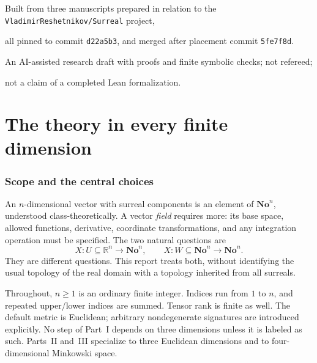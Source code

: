 \documentclass[11pt,letterpaper]{article}
\theoremstyle{definition}
\theoremstyle{remark}
\newcommand{\No}{\mathbf{No}}
\newcommand{\R}{\mathbb R}\newcommand{\C}{\mathbb C}
\newcommand{\repo}{\texttt{VladimirReshetnikov/Surreal}}
\begin{document}
\begin{titlepage}
\begin{minipage}{0.94\textwidth}
\begin{abstract}
Every infinite operation carries an explicit support hypothesis. The
obstructions, among them pointwise-invertible fields without admissible
inverses, infinite-frequency oscillations, infinite boosts and infinite times,
are proved rather than assumed away. Nothing here is a physics claim, a
regularization of singularities, or a transfer of all real analytic existence
theorems.
\end{abstract}
\end{minipage}
\vfill
{\small Built from three manuscripts prepared in relation to the \repo{} project,\par
all pinned to commit \texttt{d22a5b3}, and merged after placement commit \texttt{5fe7f8d}.\par
An AI-assisted research draft with proofs and finite symbolic checks; not refereed;\par
not a claim of a completed Lean formalization.\par}
\end{titlepage}
\hypersetup{pageanchor=true}
\begingroup\small\setlength{\parskip}{0pt}\tableofcontents\endgroup
\clearpage{}

\part{The theory in every finite dimension}\label{vtf:part:general}

\section{Scope and the central choices}\label{vtf:sec:scope}

An $n$-dimensional vector with surreal components is an element of $\No^n$,
understood class-theoretically. A vector \emph{field} requires more: its base
space, allowed functions, derivative, coordinate transformations, and any
integration operation must be specified. The two natural questions are
\[
 X:U\subseteq\R^n\longrightarrow\No^n,
 \qquad
 X:W\subseteq\No^n\longrightarrow\No^n.
\]
They are different questions. This report treats both, without identifying
the usual topology of the real domain with a topology inherited from all
surreals.

Throughout, $n\ge1$ is an ordinary finite integer. Indices run from $1$ to
$n$, and repeated upper/lower indices are summed. Tensor rank is finite as
well. The default metric is Euclidean; arbitrary nondegenerate signatures are
introduced explicitly. No step of Part~I depends on three dimensions unless it
is labeled as such. Parts~II and~III specialize to three Euclidean dimensions and
to four-dimensional Minkowski space.
\end{document}
